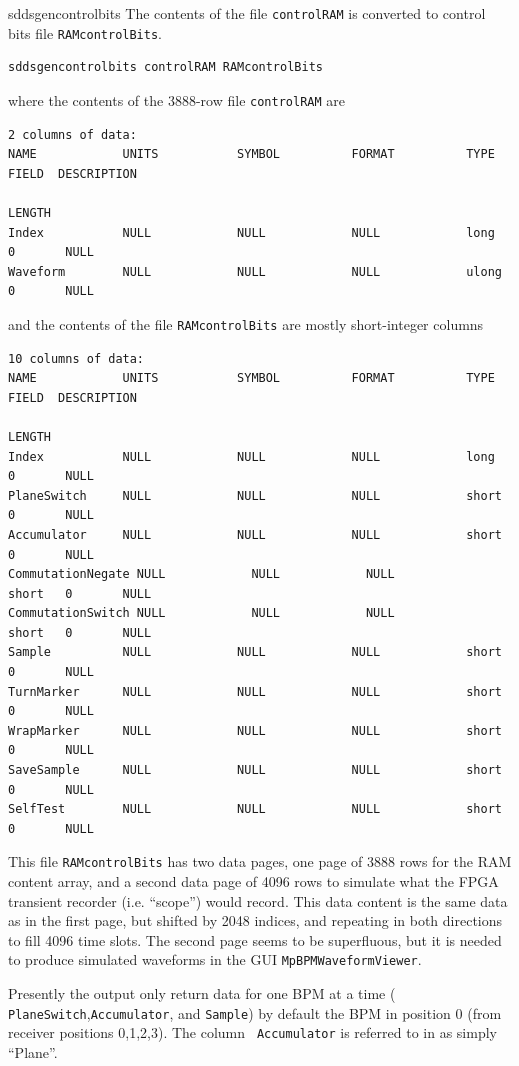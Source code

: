 \begin{sddsprog}{sddsgencontrolbits}
The contents of the file {\tt controlRAM} is converted to control bits
file {\tt RAMcontrolBits}.
\begin{verbatim}
sddsgencontrolbits controlRAM RAMcontrolBits
\end{verbatim}
where the contents of the 3888-row file {\tt controlRAM} are
\begin{verbatim}
2 columns of data:
NAME            UNITS           SYMBOL          FORMAT          TYPE    FIELD  DESCRIPTION
                                                                        LENGTH
Index           NULL            NULL            NULL            long    0       NULL
Waveform        NULL            NULL            NULL            ulong   0       NULL
\end{verbatim}
and the contents of the file {\tt RAMcontrolBits} are mostly short-integer columns
\begin{verbatim}
10 columns of data:
NAME            UNITS           SYMBOL          FORMAT          TYPE    FIELD  DESCRIPTION
                                                                        LENGTH
Index           NULL            NULL            NULL            long    0       NULL
PlaneSwitch     NULL            NULL            NULL            short   0       NULL
Accumulator     NULL            NULL            NULL            short   0       NULL
CommutationNegate NULL            NULL            NULL            short   0       NULL
CommutationSwitch NULL            NULL            NULL            short   0       NULL
Sample          NULL            NULL            NULL            short   0       NULL
TurnMarker      NULL            NULL            NULL            short   0       NULL
WrapMarker      NULL            NULL            NULL            short   0       NULL
SaveSample      NULL            NULL            NULL            short   0       NULL
SelfTest        NULL            NULL            NULL            short   0       NULL
\end{verbatim}
This file {\tt RAMcontrolBits} has two data pages, one page of 3888
rows for the RAM content array, and a second data page of 4096 rows to
simulate what the FPGA transient recorder (i.e. ``scope'') would
record. This data content is the same data as in the first page, but
shifted by 2048 indices, and repeating in both directions to fill 4096
time slots. The second page seems to be superfluous, but it is needed
to produce simulated waveforms in the GUI {\tt MpBPMWaveformViewer}.

Presently the output only return data for one BPM at a time ({\tt
PlaneSwitch},{\tt Accumulator}, and {\tt Sample}) by default the BPM
in position 0 (from receiver positions 0,1,2,3). The column {\tt
Accumulator} is referred to in \cite{Norum2007} as simply ``Plane''.


\end{sddsprog}
